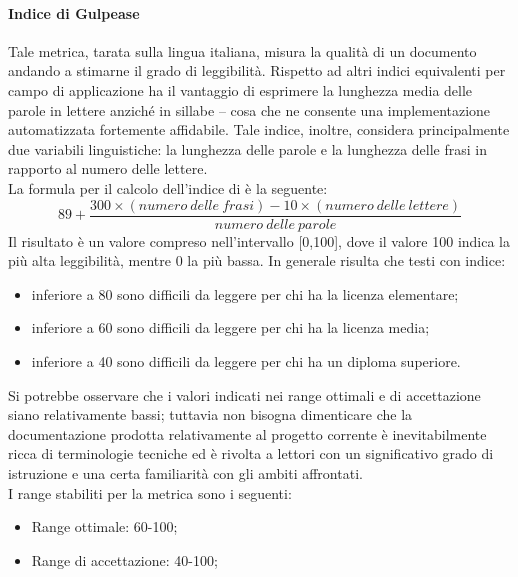 			\paragraph{Indice di Gulpease}
			Tale metrica, tarata sulla lingua italiana, misura la qualità di un documento andando a stimarne il grado di leggibilità. Rispetto ad altri indici equivalenti per campo di applicazione ha il vantaggio di esprimere la lunghezza media delle parole in lettere anziché in sillabe – cosa che ne consente una implementazione automatizzata fortemente affidabile. Tale indice, inoltre, considera principalmente due variabili linguistiche: la lunghezza delle parole e la lunghezza delle frasi in rapporto al numero delle lettere.
			\\La formula per il calcolo dell'indice di  è la seguente:
				\begin{equation}
					89+\frac{300\times(numero~delle~frasi)-10\times(numero~delle~lettere)}{numero~delle~parole}
				\end{equation}
			Il risultato è un valore compreso nell'intervallo [0,100], dove il valore 100 indica la più alta leggibilità, mentre 0 la più bassa. In generale risulta che testi con indice:
				\begin{itemize}
					\item inferiore a 80 sono difficili da leggere per chi ha la licenza elementare;
					\item inferiore a 60 sono difficili da leggere per chi ha la licenza media;
					\item inferiore a 40 sono difficili da leggere per chi ha un diploma superiore.	
				\end{itemize}
			Si potrebbe osservare che i valori indicati nei range ottimali e di accettazione siano relativamente bassi; tuttavia non bisogna dimenticare che la documentazione prodotta relativamente al progetto corrente è inevitabilmente ricca di terminologie tecniche ed è rivolta a lettori con un significativo grado di istruzione e una certa familiarità con gli ambiti affrontati.
			\\I range stabiliti per la metrica sono i seguenti:
				\begin{itemize}
					\item Range ottimale: 60-100;
					\item Range di accettazione: 40-100;
				\end{itemize}
				
